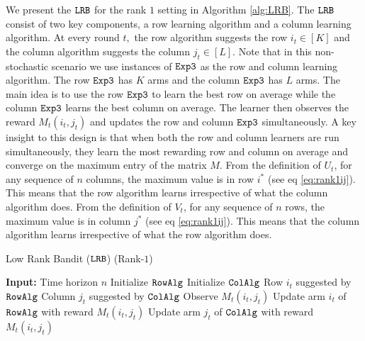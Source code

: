 We present the ${\tt LRB}$ for the rank $1$ setting in Algorithm \ref{alg:LRB}. The ${\tt LRB}$ consist of two key components, a row learning algorithm and a column learning algorithm. At every round $t,$ the row algorithm suggests the row $i_t \in [K]$ and the column algorithm suggests the column $j_t\in [L]$. Note that in this non-stochastic scenario we use instances of ${\tt Exp3}$ as the row and column learning algorithm. The row ${\tt Exp3}$ has $K$ arms and the column ${\tt Exp3}$ has $L$ arms. The main idea is to use the row ${\tt Exp3}$ to learn the best row on average while the column ${\tt Exp3}$ learns the best column on average. The learner then observes the reward $M_t(i_t, j_t)$ and updates the row and column ${\tt Exp3}$ simultaneously. A key insight to this design is that when both the row and column learners are run simultaneously, they learn the most rewarding row and column on average and converge on the maximum entry of the matrix $M$. From the definition of $U_t$, for any sequence of $n$ columns, the maximum value is in row $i^\ast$ (see eq \eqref{eq:rank1ij}). This means that the row algorithm learns irrespective of what the column algorithm does. From the definition of $V_t$, for any sequence of $n$ rows, the maximum value is in column $j^\ast$ (see eq \eqref{eq:rank1ij}). This means that the column algorithm learns irrespective of what the row algorithm does. %
\begin{algorithm}[t]
  \caption{Low Rank Bandit (${\tt LRB}$) (Rank-$1$)}
  \label{alg:LRB}
  \begin{algorithmic}[1]
    \State \textbf{Input:} Time horizon $n$
      \State Initialize ${\tt RowAlg} $
      \State Initialize ${\tt ColAlg} $
        \State Row $i_t$ suggested by ${\tt RowAlg}$
        \State Column $j_t$ suggested by ${\tt ColAlg}$
        \State Observe $M_t(i_t, j_t)$
    \State Update arm $i_t$ of ${\tt RowAlg}$ with reward $M_t(i_t, j_t)$
    \State Update arm $j_t$ of ${\tt ColAlg}$ with reward $M_t(i_t, j_t)$
     \EndFor
  \end{algorithmic}
\end{algorithm}
